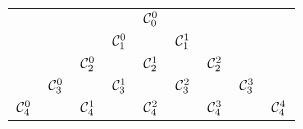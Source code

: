 \documentclass[11pt]{article}
\begin{document}
\begin{tabular}{ccccccccc}
    &&&& $\comb{0}{0}$\\
    &&&  $\comb{0}{1}$ && $\comb{1}{1}$\\
    &&   $\comb{0}{2}$ && $\comb{1}{2}$ && $\comb{2}{2}$\\
    &    $\comb{0}{3}$ && $\comb{1}{3}$ && $\comb{2}{3}$ && $\comb{3}{3}$\\
         $\comb{0}{4}$ && $\comb{1}{4}$ && $\comb{2}{4}$ && $\comb{3}{4}$ && $\comb{4}{4}$\\
\end{tabular}
\end{document}
